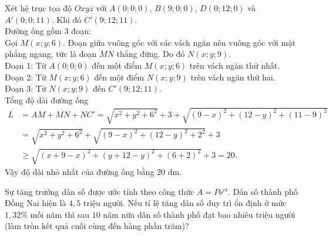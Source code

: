 \begin{ex}
{\begin{center}
	\end{center}
	Xét hệ trục tọa độ $Oxyz$ với $A(0;0;0)$, $B(9;0;0)$, $D(0;12;0)$ và $A'(0;0;11)$. Khi đó $C'(9;12;11)$.\\
	Đường ống gồm 3 đoạn:\\
	Gọi $M(x;y;6)$. Đoạn giữa vuông góc với các vách ngăn nên vuông góc với mặt phẳng ngang, tức là đoạn $MN$ thẳng đứng. Do đó $N(x;y;9)$.\\
	Đoạn 1: Từ $A(0;0;0)$ đến một điểm $M(x; y; 6)$ trên vách ngăn thứ nhất.\\
	Đoạn 2: Từ $M(x; y; 6)$ đến một điểm $N(x; y; 9)$ trên vách ngăn thứ hai.\\
	Đoạn 3: Từ $N(x; y; 9)$ đến $C'(9;12;11)$.\\
	Tổng độ dài đường ống\\
	$$\begin{aligned}
	L &= AM + MN + NC' = \sqrt{x^2 + y^2 + 6^2} + 3 + \sqrt{(9-x)^2 + (12-y)^2 + (11-9)^2}\\
	  &= \sqrt{x^2 + y^2 + 6^2} + \sqrt{(9-x)^2 + (12-y)^2 + 2^2} + 3\\
	&\ge \sqrt{(x + 9 - x)^2 + (y + 12 - y)^2 + (6 + 2)^2} +3 = 20.	
	\end{aligned}$$
	Vậy độ dài nhỏ nhất của đường ống bằng $20$ dm.
	}
\end{ex}

\begin{ex}%
	Sự tăng trưởng dân số được ước tính theo công thức $A=P\mathrm{e}^{rt}$. Dân số thành phố Đồng Nai hiện là $4{,}5$ triệu người. Nếu tỉ lệ tăng dân số duy trì ổn định ở mức $1{,}32\%$ mỗi năm thì sau $10$ năm nữa dân số thành phố đạt bao nhiêu triệu người (làm tròn kết quả cuối cùng đến hàng phần trăm)? 
\end{ex}

